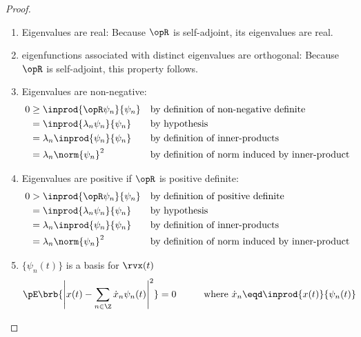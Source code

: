 \begin{proof}
\begin{enumerate}
\item Eigenvalues are real:
Because $\opR$ is self-adjoint, its eigenvalues are real.

\item eigenfunctions associated with distinct eigenvalues are orthogonal:
Because $\opR$ is self-adjoint, this property follows.

\item Eigenvalues are non-negative:
\begin{align*}
   0 &\ge \inprod{\opR \psi_n}{\psi_n}
     &&   \text{by definition of non-negative definite}
   \\&=   \inprod{\lambda_n \psi_n}{\psi_n}
     &&   \text{by hypothesis}
   \\&=   \lambda_n \inprod{\psi_n}{\psi_n}
     &&   \text{by definition of inner-products}
   \\&=   \lambda_n \norm{\psi_n}^2
     &&   \text{by definition of norm induced by inner-product}
\end{align*}

\item Eigenvalues are positive if $\opR$ is positive definite:
\begin{align*}
   0 &> \inprod{\opR \psi_n}{\psi_n}
     && \text{by definition of positive definite}
   \\&= \inprod{\lambda_n \psi_n}{\psi_n}
     && \text{by hypothesis}
   \\&= \lambda_n \inprod{\psi_n}{\psi_n}
     && \text{by definition of inner-products}
   \\&= \lambda_n \norm{\psi_n}^2
     && \text{by definition of norm induced by inner-product}
\end{align*}

\item $\{\psi_n(t)\}$ is a basis for $\rvx(t)$
      \[ \pE\brb{\left| x(t)-\sum_{n\in\Z}\dot{x}_n \psi_n(t) \right|^2} = 0
         \hspace{1cm}\mbox{where } \dot{x}_n\eqd \inprod{x(t)}{\psi_n(t)}
      \]


\end{enumerate}
\end{proof}
